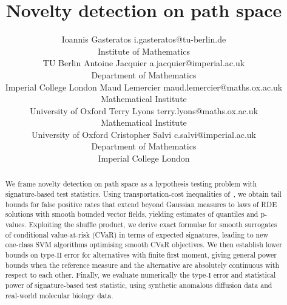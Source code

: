 \documentclass[twoside,11pt]{article}
\numberwithin{equation}{section}
\numberwithin{theorem}{section}
\begin{document}
\title{Novelty detection on path space}

\author{\name Ioannis Gasteratos 
        \email i.gasteratos@tu-berlin.de \\
        \addr Institute of Mathematics\\
        TU Berlin
       \AND
       \name Antoine Jacquier 
       \email a.jacquier@imperial.ac.uk \\
       \addr Department of Mathematics\\
       Imperial College London
       \AND
       \name Maud Lemercier 
       \email maud.lemercier@maths.ox.ac.uk \\
       \addr Mathematical Institute \\
       University of Oxford
       \AND
       \name Terry Lyons 
       \email terry.lyons@maths.ox.ac.uk \\
       \addr Mathematical Institute \\
       University of Oxford
       \AND
       \name Cristopher Salvi 
       \email c.salvi@imperial.ac.uk \\
       \addr Department of Mathematics\\
       Imperial College London
       }

\maketitle

\begin{abstract}
We frame novelty detection on path space as a hypothesis testing problem with signature-based test statistics. Using transportation-cost inequalities of~\citet{gasteratos2023transportation}, we obtain tail bounds for false positive rates that extend beyond Gaussian measures to laws of RDE solutions with smooth bounded vector fields, yielding estimates of quantiles and p-values. Exploiting the shuffle product, we derive exact formulae for smooth surrogates of conditional value-at-risk (CVaR) in terms of expected signatures, leading to new one-class SVM algorithms optimising smooth CVaR objectives. We then establish lower bounds on type-$\mathrm{II}$ error for alternatives with finite first moment, giving general power bounds when the reference measure and the alternative are absolutely continuous with respect to each other. Finally, we evaluate numerically the type-$\mathrm{I}$ error and statistical power of signature-based test statistic, using synthetic anomalous diffusion data and real-world molecular biology data.
\end{abstract}
\end{document}
